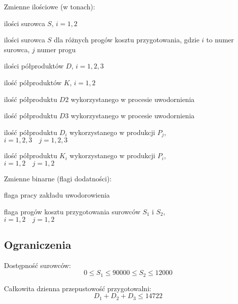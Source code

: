 \documentclass[a4paper,10pt,fleqn]{article}
\begin{document}
		Zmienne ilościowe (w tonach):
		\begin{description}[align=left,labelwidth=1.5cm]
			\item[$S_i$] ilości surowca $S$, $i = 1,2$
			\item[$s_{ij}$] ilości surowca $S$ dla różnych progów kosztu przygotowania, gdzie $i$ to numer surowca, $j$ numer progu
			\item[$D_i$] ilości półproduktów $D$, $i = 1, 2, 3$
			\item[$K_i$] ilość półproduktów $K$, $i = 1, 2$
			\item[$DK_2$] ilość półproduktu $D2$ wykorzystanego w procesie uwodornienia
			\item[$DK_3$] ilość półproduktu $D3$ wykorzystanego w procesie uwodornienia
			\item[$DP_{ij}$] ilość półproduktu $D_i$ wykorzystanego w produkcji $P_j$, \\$i=1, 2, 3 \quad j=1, 2, 3$
	
			\item[$KP_{ij}$] ilość półproduktu $K_i$ wykorzystanego w produkcji $P_i$, \\$i=1, 2\quad j=1, 2$
		\end{description}

		Zmienne binarne (flagi dodatności):
		\begin{description}[align=left,labelwidth=1.5cm]
			\item[$w$] flaga pracy zakładu uwodorowienia
			\item[$u_{ij}$] flaga progów kosztu przygotowania surowców $S_1$ i $S_2$, \\$i = 1, 2 \quad j = 1, 2$
		\end{description}

		\subsection{Ograniczenia}

		Dostępność surowców:
		\begin{subequations}
			\begin{equation}
				0 \leq S_1 \leq 9000
			\end{equation}
			\begin{equation}
				0 \leq S_2 \leq 12000
			\end{equation}
		\end{subequations}

		Całkowita dzienna przepustowość przygotowalni:
		\begin{equation}
			D_1 + D_2 + D_3 \leq 14722
		\end{equation}
\end{document}
